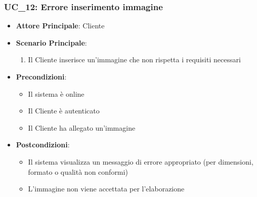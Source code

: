 \subsubsection{UC\_12: Errore inserimento immagine}
\label{uc_12}

\begin{itemize}
    \item \textbf{Attore Principale}: Cliente
	 \item \textbf{Scenario Principale}:
    \begin{enumerate}
        \item Il Cliente inserisce un'immagine che non rispetta i requisiti necessari
    \end{enumerate}
   \item \textbf{Precondizioni}:
		\begin{itemize}
         \item Il sistema è online
         \item Il Cliente è autenticato
			\item Il Cliente ha allegato un'immagine
		\end{itemize}
	\item \textbf{Postcondizioni}:
   \begin{itemize}
      \item Il sistema visualizza un messaggio di errore appropriato (per dimensioni, formato o qualità non conformi)
      \item L'immagine non viene accettata per l'elaborazione
   \end{itemize}
\end{itemize}